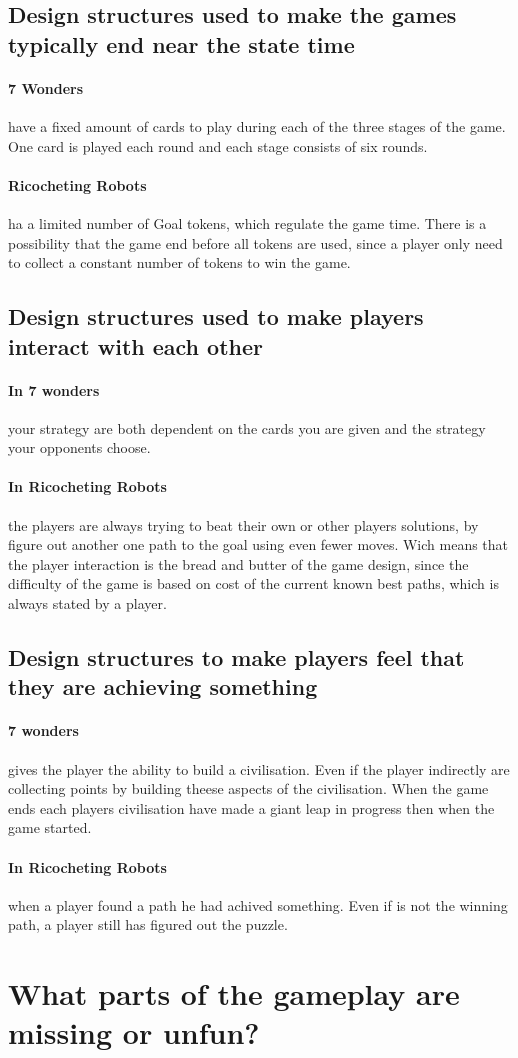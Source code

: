 \documentclass[a4paper]{article}
\begin{document}
\subsection{Design structures used to make the games typically end near the state time}
\paragraph{7 Wonders} have a fixed amount of cards to play during each of the three stages of the game. One card is played each round and each stage consists of six rounds.

\paragraph{Ricocheting Robots} ha a limited number of Goal tokens, which regulate the game time. There is a possibility that the game end before all tokens are used, since a player only need to collect a constant number of tokens to win the game.

\subsection{Design structures used to make players interact with each other}

\paragraph{In 7 wonders} your strategy are both dependent on the cards you are given and the strategy your opponents choose.

\paragraph{In Ricocheting Robots} the players are always trying to beat their own or other players solutions, by figure out another one path to the goal using even fewer moves. Wich means that the player interaction is the bread and butter of the game design, since the difficulty of the game is based on cost of the current known best paths, which is always stated by a player.

\subsection{Design structures to make players feel that they are achieving something}
\paragraph{7 wonders} gives the player the ability to build a civilisation. Even if the player indirectly are collecting points by building theese aspects of the civilisation. When the game ends each players civilisation have made a giant leap in progress then when the game started.

\paragraph{In Ricocheting Robots} when a player found a path he had achived something. Even if is not the winning path, a player still has figured out the puzzle.

\section{What parts of the gameplay are missing or unfun?}


\newpage


\end{document}
